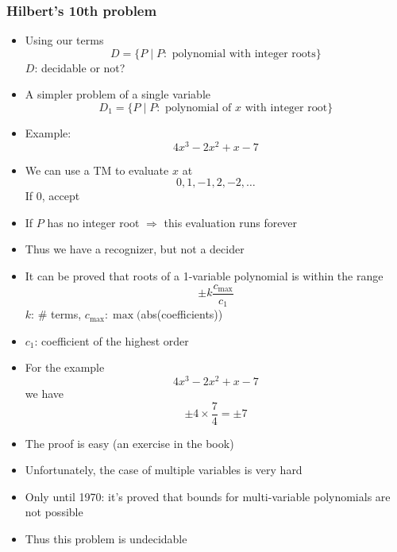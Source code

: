 \begin{frame}[allowframebreaks] \frametitle{Hilbert's 10th problem}
  \begin{itemize}
\item
Using our terms
\begin{equation*}
D=\{P\mid P: \text{ polynomial with integer roots}\}
\end{equation*}
$D$: decidable or not?
\item A simpler problem of a single variable
  \begin{equation*}
D_1=\{P\mid P: \text{ polynomial of $x$ with integer root}\}
\end{equation*}
\item Example:
  \begin{equation*}
4x^3 - 2x^2 + x - 7
\end{equation*}
\item We can use a TM to
evaluate $x$ at
\begin{equation*}
0,1, -1, 2, -2, \ldots
\end{equation*}
If 0, accept
\item If $P$ has no integer root $\Rightarrow$
this evaluation runs forever

\item
  Thus we have a recognizer, but not a decider
\item It can be proved that roots of a 1-variable polynomial
  is within the range
  \begin{equation*}
    \pm k \frac{c_{\max}}{c_1}
  \end{equation*}
$k$: \# terms, $c_{\max}: \max($abs(coefficients))

\item [] $c_1$: coefficient of the highest order
\item For the example
  \begin{equation*}
4x^3 - 2x^2 + x - 7
\end{equation*}
we have
\begin{equation*}
  \pm 4 \times \frac{7}{4} = \pm 7
\end{equation*}

\item The proof is easy (an exercise in the book)
\item
  Unfortunately, the case of multiple variables is very hard
  
\item Only until 1970: it's proved
  that bounds for multi-variable polynomials
are not possible

\item
  Thus this problem is undecidable

\end{itemize}\end{frame}
